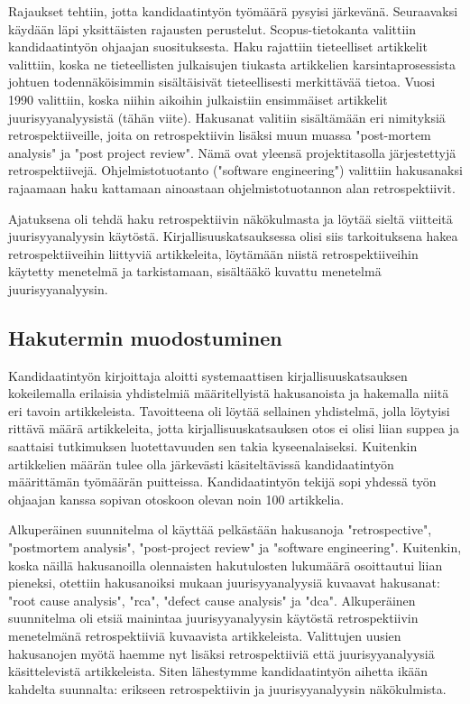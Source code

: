 Rajaukset tehtiin, jotta kandidaatintyön työmäärä pysyisi järkevänä. Seuraavaksi käydään läpi yksittäisten rajausten perustelut. Scopus-tietokanta valittiin kandidaatintyön ohjaajan suosituksesta. Haku rajattiin tieteelliset artikkelit valittiin, koska ne tieteellisten julkaisujen tiukasta artikkelien karsintaprosessista johtuen todennäköisimmin sisältäisivät tieteellisesti merkittävää tietoa. Vuosi 1990 valittiin, koska niihin aikoihin julkaistiin ensimmäiset artikkelit juurisyyanalyysistä (tähän viite). Hakusanat valitiin sisältämään eri nimityksiä retrospektiiveille, joita on retrospektiivin lisäksi muun muassa "post-mortem analysis" ja "post project review". Nämä ovat yleensä projektitasolla järjestettyjä retrospektiivejä. Ohjelmistotuotanto ("software engineering") valittiin hakusanaksi rajaamaan haku kattamaan ainoastaan ohjelmistotuotannon alan retrospektiivit.

Ajatuksena oli tehdä haku retrospektiivin näkökulmasta ja löytää sieltä viitteitä juurisyyanalyysin käytöstä. Kirjallisuuskatsauksessa olisi siis tarkoituksena hakea retrospektiiveihin liittyviä artikkeleita, löytämään niistä retrospektiiveihin käytetty menetelmä ja tarkistamaan, sisältääkö kuvattu menetelmä juurisyyanalyysin.

\subsection{Hakutermin muodostuminen}
Kandidaatintyön kirjoittaja aloitti systemaattisen kirjallisuuskatsauksen kokeilemalla erilaisia yhdistelmiä määritellyistä hakusanoista ja hakemalla niitä eri tavoin artikkeleista. Tavoitteena oli löytää sellainen yhdistelmä, jolla löytyisi rittävä määrä artikkeleita, jotta kirjallisuuskatsauksen otos ei olisi liian suppea ja saattaisi tutkimuksen luotettavuuden sen takia kyseenalaiseksi. Kuitenkin artikkelien määrän tulee olla järkevästi käsiteltävissä kandidaatintyön määrittämän työmäärän puitteissa. Kandidaatintyön tekijä sopi yhdessä työn ohjaajan kanssa sopivan otoskoon olevan noin 100 artikkelia.

Alkuperäinen suunnitelma ol käyttää pelkästään hakusanoja "retrospective",  "postmortem analysis", "post-project review" ja "software engineering". Kuitenkin, koska näillä hakusanoilla olennaisten hakutulosten lukumäärä osoittautui liian pieneksi, otettiin hakusanoiksi mukaan juurisyyanalyysiä kuvaavat hakusanat: "root cause analysis", "rca", "defect cause analysis" ja "dca". 
Alkuperäinen suunnitelma oli etsiä mainintaa juurisyyanalyysin käytöstä retrospektiivin menetelmänä retrospektiiviä kuvaavista artikkeleista. Valittujen uusien hakusanojen myötä haemme nyt lisäksi retrospektiiviä että juurisyyanalyysiä käsittelevistä artikkeleista. Siten lähestymme kandidaatintyön aihetta ikään kahdelta suunnalta: erikseen retrospektiivin ja juurisyyanalyysin näkökulmista.

